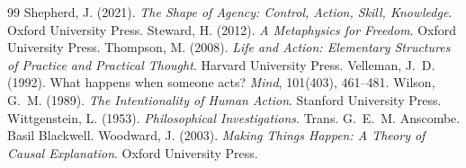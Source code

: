 \documentclass{situationist-preprint}
\begin{document}
\begin{thebibliography}{99}
 Shepherd, J. (2021). \emph{The Shape of Agency: Control, Action, Skill, Knowledge}. Oxford University Press.
 Steward, H. (2012). \emph{A Metaphysics for Freedom}. Oxford University Press.
 Thompson, M. (2008). \emph{Life and Action: Elementary Structures of Practice and Practical Thought}. Harvard University Press.
 Velleman, J.~D. (1992). What happens when someone acts? \emph{Mind}, 101(403), 461--481.
 Wilson, G.~M. (1989). \emph{The Intentionality of Human Action}. Stanford University Press.
 Wittgenstein, L. (1953). \emph{Philosophical Investigations}. Trans. G.~E.~M. Anscombe. Basil Blackwell.
 Woodward, J. (2003). \emph{Making Things Happen: A Theory of Causal Explanation}. Oxford University Press.
\end{thebibliography}
\end{document}
